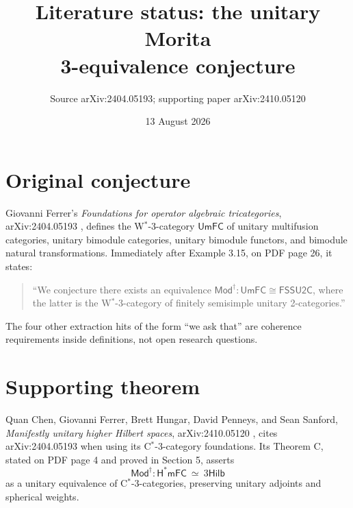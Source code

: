 \documentclass[11pt]{article}
\title{Literature status: the unitary Morita\\3-equivalence conjecture}
\author{Source arXiv:2404.05193; supporting paper arXiv:2410.05120}
\date{13 August 2026}
\begin{document}
\maketitle

\begin{center}
\end{center}

\section*{Original conjecture}

Giovanni Ferrer's \emph{Foundations for operator algebraic tricategories},
arXiv:2404.05193 \cite{Ferrer}, defines the W$^*$-3-category
$\mathsf{UmFC}$ of unitary multifusion categories, unitary bimodule
categories, unitary bimodule functors, and bimodule natural transformations.
Immediately after Example 3.15, on PDF page 26, it states:
\begin{quote}
``We conjecture there exists an equivalence
$\mathsf{Mod}^{\dagger}\colon \mathsf{UmFC}\cong\mathsf{FSSU2C}$, where the
latter is the W$^*$-3-category of finitely semisimple unitary 2-categories.''
\end{quote}
The four other extraction hits of the form ``we ask that'' are coherence
requirements inside definitions, not open research questions.

\section*{Supporting theorem}

Quan Chen, Giovanni Ferrer, Brett Hungar, David Penneys, and Sean Sanford,
\emph{Manifestly unitary higher Hilbert spaces}, arXiv:2410.05120
\cite{CFHPS}, cites arXiv:2404.05193 when using its C$^*$-3-category
foundations.  Its Theorem C, stated on PDF page 4 and proved in Section 5,
asserts
\[
 \mathsf{Mod}^{\dagger}\colon
 \mathsf{H}^{*}\mathsf{mFC}\ \simeq\ 3\mathsf{Hilb}
\]
as a unitary equivalence of C$^*$-3-categories, preserving unitary adjoints
and spherical weights.
\end{document}
